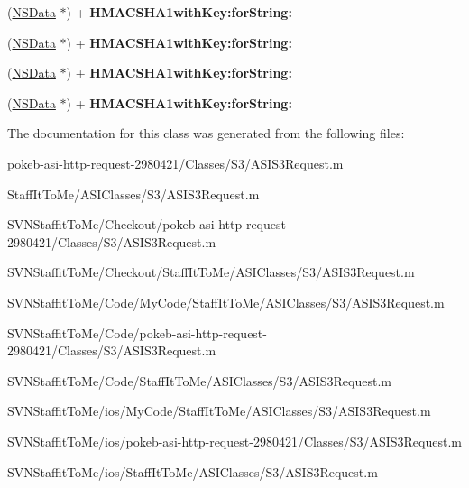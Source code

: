 \begin{DoxyCompactItemize}
\item 
\hypertarget{interface_a_s_i_s3_request_07_08_a894f809afa5c5ec55231089f2d2af54f}{
(\hyperlink{class_n_s_data}{\-N\-S\-Data} $\ast$) + {\bfseries \-H\-M\-A\-C\-S\-H\-A1with\-Key\-:for\-String\-:}}
\label{interface_a_s_i_s3_request_07_08_a894f809afa5c5ec55231089f2d2af54f}

\item 
\hypertarget{interface_a_s_i_s3_request_07_08_a894f809afa5c5ec55231089f2d2af54f}{
(\hyperlink{class_n_s_data}{\-N\-S\-Data} $\ast$) + {\bfseries \-H\-M\-A\-C\-S\-H\-A1with\-Key\-:for\-String\-:}}
\label{interface_a_s_i_s3_request_07_08_a894f809afa5c5ec55231089f2d2af54f}

\item 
\hypertarget{interface_a_s_i_s3_request_07_08_a894f809afa5c5ec55231089f2d2af54f}{
(\hyperlink{class_n_s_data}{\-N\-S\-Data} $\ast$) + {\bfseries \-H\-M\-A\-C\-S\-H\-A1with\-Key\-:for\-String\-:}}
\label{interface_a_s_i_s3_request_07_08_a894f809afa5c5ec55231089f2d2af54f}

\item 
\hypertarget{interface_a_s_i_s3_request_07_08_a894f809afa5c5ec55231089f2d2af54f}{
(\hyperlink{class_n_s_data}{\-N\-S\-Data} $\ast$) + {\bfseries \-H\-M\-A\-C\-S\-H\-A1with\-Key\-:for\-String\-:}}
\label{interface_a_s_i_s3_request_07_08_a894f809afa5c5ec55231089f2d2af54f}

\end{DoxyCompactItemize}


\-The documentation for this class was generated from the following files\-:\begin{DoxyCompactItemize}
\item 
pokeb-\/asi-\/http-\/request-\/2980421/\-Classes/\-S3/\-A\-S\-I\-S3\-Request.\-m\item 
\-Staff\-It\-To\-Me/\-A\-S\-I\-Classes/\-S3/\-A\-S\-I\-S3\-Request.\-m\item 
\-S\-V\-N\-Staffit\-To\-Me/\-Checkout/pokeb-\/asi-\/http-\/request-\/2980421/\-Classes/\-S3/\-A\-S\-I\-S3\-Request.\-m\item 
\-S\-V\-N\-Staffit\-To\-Me/\-Checkout/\-Staff\-It\-To\-Me/\-A\-S\-I\-Classes/\-S3/\-A\-S\-I\-S3\-Request.\-m\item 
\-S\-V\-N\-Staffit\-To\-Me/\-Code/\-My\-Code/\-Staff\-It\-To\-Me/\-A\-S\-I\-Classes/\-S3/\-A\-S\-I\-S3\-Request.\-m\item 
\-S\-V\-N\-Staffit\-To\-Me/\-Code/pokeb-\/asi-\/http-\/request-\/2980421/\-Classes/\-S3/\-A\-S\-I\-S3\-Request.\-m\item 
\-S\-V\-N\-Staffit\-To\-Me/\-Code/\-Staff\-It\-To\-Me/\-A\-S\-I\-Classes/\-S3/\-A\-S\-I\-S3\-Request.\-m\item 
\-S\-V\-N\-Staffit\-To\-Me/ios/\-My\-Code/\-Staff\-It\-To\-Me/\-A\-S\-I\-Classes/\-S3/\-A\-S\-I\-S3\-Request.\-m\item 
\-S\-V\-N\-Staffit\-To\-Me/ios/pokeb-\/asi-\/http-\/request-\/2980421/\-Classes/\-S3/\-A\-S\-I\-S3\-Request.\-m\item 
\-S\-V\-N\-Staffit\-To\-Me/ios/\-Staff\-It\-To\-Me/\-A\-S\-I\-Classes/\-S3/\-A\-S\-I\-S3\-Request.\-m\end{DoxyCompactItemize}
